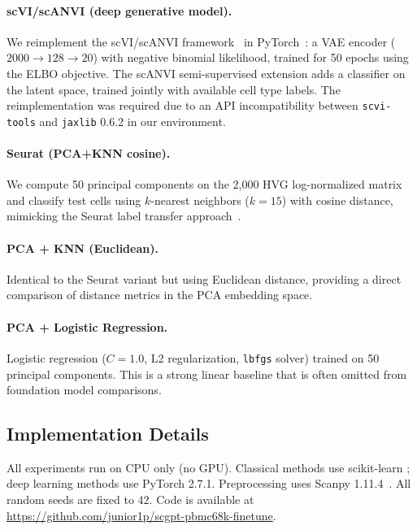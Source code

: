 \documentclass{article}
\begin{document}
\paragraph{scVI/scANVI (deep generative model).}
We reimplement the scVI/scANVI framework~\citep{lopez2018deep,xu2021probabilistic} in
PyTorch~\citep{paszke2019pytorch}: a VAE encoder ($2000 \to 128 \to 20$) with negative
binomial likelihood, trained for 50 epochs using the ELBO objective. The scANVI
semi-supervised extension adds a classifier on the latent space, trained jointly with
available cell type labels. The reimplementation was required due to an API incompatibility
between \texttt{scvi-tools} and \texttt{jaxlib} 0.6.2 in our environment.

\paragraph{Seurat (PCA+KNN cosine).}
We compute 50 principal components on the 2,000 HVG log-normalized matrix and classify
test cells using $k$-nearest neighbors ($k=15$) with cosine distance, mimicking the
Seurat label transfer approach~\citep{stuart2019comprehensive}.

\paragraph{PCA + KNN (Euclidean).}
Identical to the Seurat variant but using Euclidean distance, providing a direct
comparison of distance metrics in the PCA embedding space.

\paragraph{PCA + Logistic Regression.}
Logistic regression ($C=1.0$, L2 regularization, \texttt{lbfgs} solver) trained on 50
principal components. This is a strong linear baseline that is often omitted from
foundation model comparisons.

\subsection{Implementation Details}
All experiments run on CPU only (no GPU). Classical methods use scikit-learn
\citep{pedregosa2011scikit}; deep learning methods use PyTorch 2.7.1. Preprocessing uses
Scanpy 1.11.4~\citep{wolf2018scanpy}. All random seeds are fixed to 42. Code is available
at \url{https://github.com/junior1p/scgpt-pbmc68k-finetune}.

\end{document}
